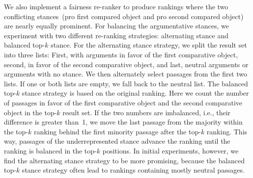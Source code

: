 We also implement a fairness re-ranker to produce rankings where the two conflicting stances~(pro first compared object and pro second compared object) are nearly equally prominent.
For balancing the argumentative stances, we experiment with two different re-ranking strategies: \Ni alternating stance and \Nii balanced top-\(k\) stance.
For the alternating stance strategy, we split the result set into three lists: First, with arguments in favor of the first comparative object, second, in favor of the second comparative object, and last, neutral arguments or arguments with no stance.
We then alternately select passages from the first two lists. If one or both lists are empty, we fall back to the neutral list.
The balanced top-\(k\) stance strategy is based on the original ranking.
Here we count the number of passages in favor of the first comparative object and the second comparative object in the top-\(k\) result set.
If the two numbers are imbalanced, i.e., their difference is greater than~1, we move the last passage from the majority within the top-\(k\) ranking behind the first minority passage after the top-\(k\) ranking.
This way, passages of the underrepresented stance advance the ranking until the ranking is balanced in the top-\(k\) positions.
In initial experiments, however, we find the alternating stance strategy to be more promising, because the balanced top-\(k\) stance strategy often lead to rankings containing mostly neutral passages.
